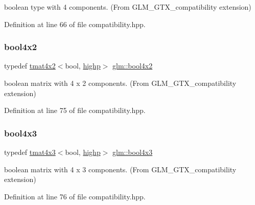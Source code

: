 boolean type with 4 components. (From G\+L\+M\+\_\+\+G\+T\+X\+\_\+compatibility extension) 



Definition at line 66 of file compatibility.\+hpp.

\mbox{\label{group__gtx__compatibility_ga2d956a9ea3d4c8e8ec12797c9d7cb677}} 
\subsubsection{\texorpdfstring{bool4x2}{bool4x2}}
{\footnotesize\ttfamily typedef \mbox{\hyperlink{structglm_1_1tmat4x2}{tmat4x2}}$<$bool, \mbox{\hyperlink{namespaceglm_a0f04f086094c747d227af4425893f545ac6f7eab42eacbb10d59a58e95e362074}{highp}}$>$ \mbox{\hyperlink{group__gtx__compatibility_ga2d956a9ea3d4c8e8ec12797c9d7cb677}{glm\+::bool4x2}}}



boolean matrix with 4 x 2 components. (From G\+L\+M\+\_\+\+G\+T\+X\+\_\+compatibility extension) 



Definition at line 75 of file compatibility.\+hpp.

\mbox{\label{group__gtx__compatibility_gafd85fa864c89a6b1b4887d2790132c5c}} 
\subsubsection{\texorpdfstring{bool4x3}{bool4x3}}
{\footnotesize\ttfamily typedef \mbox{\hyperlink{structglm_1_1tmat4x3}{tmat4x3}}$<$bool, \mbox{\hyperlink{namespaceglm_a0f04f086094c747d227af4425893f545ac6f7eab42eacbb10d59a58e95e362074}{highp}}$>$ \mbox{\hyperlink{group__gtx__compatibility_gafd85fa864c89a6b1b4887d2790132c5c}{glm\+::bool4x3}}}



boolean matrix with 4 x 3 components. (From G\+L\+M\+\_\+\+G\+T\+X\+\_\+compatibility extension) 



Definition at line 76 of file compatibility.\+hpp.

\mbox{\label{group__gtx__compatibility_gafd4a5a69fab4d76f91ee75684f3bf2f1}} 
